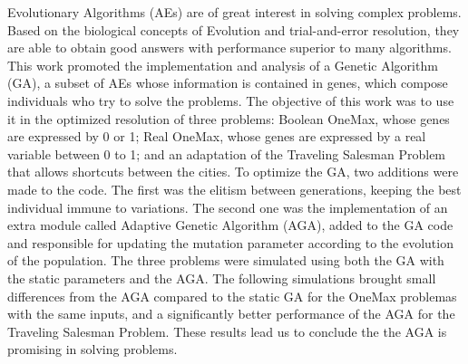 Evolutionary Algorithms (AEs) are of great interest in solving complex problems. Based on the biological concepts of Evolution and trial-and-error resolution, they are able to obtain good answers with performance superior to many algorithms. This work promoted the implementation and analysis of a Genetic Algorithm (GA), a subset of AEs whose information is contained in genes, which compose individuals who try to solve the problems. The objective of this work was to use it in the optimized resolution of three problems: Boolean OneMax, whose genes are expressed by 0 or 1; Real OneMax, whose genes are expressed by a real variable between 0 to 1; and an adaptation of the Traveling Salesman Problem that allows shortcuts between the cities. To optimize the GA, two additions were made to the code. The first was the elitism between generations, keeping the best individual immune to variations. The second one was the implementation of an extra module called Adaptive Genetic Algorithm (AGA), added to the GA code and responsible for updating the mutation parameter according to the evolution of the population. The three problems were simulated using both the GA with the static parameters and the AGA. The following simulations brought small differences from the AGA compared to the static GA for the OneMax problemas with the same inputs, and a significantly better performance of the AGA for the Traveling Salesman Problem. These results lead us to conclude the the AGA is promising in solving problems.